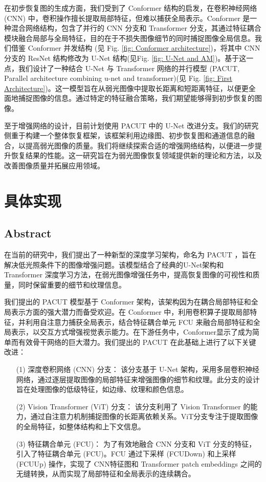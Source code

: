 \documentclass[a4paper]{ctexart}
\begin{document}
	在初步恢复图的生成方面，我们受到了 Conformer\cite{peng2021conformer} 结构的启发，在卷积神经网络 (CNN) 中，卷积操作擅长提取局部特征，但难以捕获全局表示。Conformer 是一种混合网络结构，包含了并行的 CNN 分支和 Transformer 分支，其通过特征耦合模块融合局部与全局特征，目的在于不损失图像细节的同时捕捉图像全局信息。我们借鉴 Conformer 并发结构 (见 Fig. \ref{fig: Conformer architecture})，将其中 CNN 分支的 ResNet 结构修改为 U-Net 结构(见Fig. \ref{fig: U-Net and AM})。基于这一点，我们设计了一种结合 U-Net 与 Transformer 网络的并行模型 (PACUT, Parallel architecture combining u-net and transformer)(见 Fig. \ref{fig: First Architecture})。这一模型旨在从弱光图像中提取长距离和短距离特征，以便更全面地捕捉图像的信息。通过特定的特征融合策略，我们期望能够得到初步恢复的图像。
	
	至于增强网络的设计，目前计划使用 PACUT 中的 U-Net 改进分支。我们的研究侧重于构建一个整体恢复框架，该框架利用边缘图、初步恢复图和通道信息的融合，以提高弱光图像的质量。我们将继续探索合适的增强网络结构，以便进一步提升恢复结果的性能。这一研究旨在为弱光图像恢复领域提供新的理论和方法，以及改善图像质量并拓展应用领域。
	
	\section{具体实现}
	
	\subsection{Abstract}
	
	在当前的研究中，我们提出了一种新型的深度学习架构，命名为 PACUT ，旨在解决低光照条件下的图像增强问题。该模型结合了经典的U-Net架构和 Transformer 深度学习方法，在弱光图像增强任务中，提高恢复图像的可视性和质量，同时保留重要的细节和纹理信息。
	
	我们提出的 PACUT 模型基于 Conformer 架构，该架构因为在耦合局部特征和全局表示方面的强大潜力而备受欢迎。在 Conformer 中，利用卷积算子提取局部特征，并利用自注意力捕获全局表示，结合特征耦合单元 FCU 来融合局部特征和全局表示，以交互方式增强视觉表示能力。在下游任务中，Conformer显示了成为简单而有效骨干网络的巨大潜力。我们提出的 PACUT 在此基础上进行了以下关键改进：
	
	\begin{itemize}
		
		\item[(1)] 
		深度卷积网络 (CNN) 分支： 该分支基于 U-Net 架构，采用多层卷积神经网络，通过逐层提取图像的局部特征来增强图像的细节和纹理。此分支的设计旨在处理图像的低级特征，如边缘、纹理和颜色信息。
		
		\item[(2)]
		Vision Transformer (ViT) 分支： 该分支利用了 Vision Transformer 的能力，通过自注意力机制捕捉图像的长距离依赖关系。ViT分支专注于提取图像的全局特征，如整体结构和上下文信息。
		
		\item[(3)]
		特征耦合单元 (FCU)： 为了有效地融合 CNN 分支和 ViT 分支的特征，引入了特征耦合单元 (FCU)。FCU 通过下采样 (FCUDown) 和上采样 (FCUUp) 操作，实现了 CNN特征图和 Transformer patch embeddings 之间的无缝转换，从而实现了局部特征和全局表示的连续耦合。
		
	\end{itemize}
	
\end{document}
